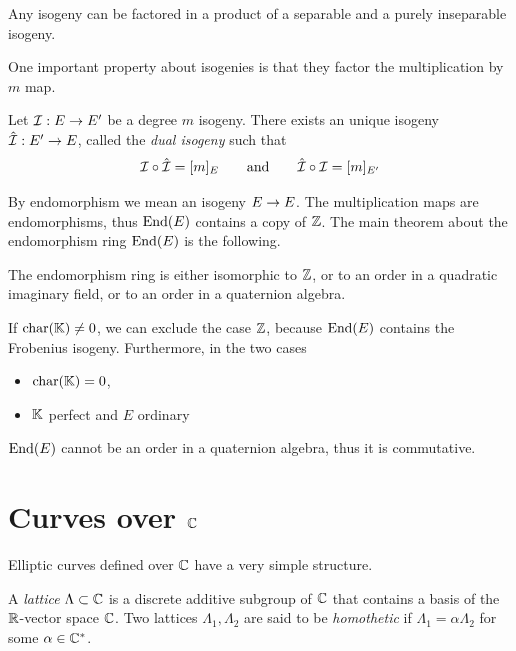 \begin{theorem}
  Any isogeny can be factored in a product of a separable and a purely
  inseparable isogeny.
\end{theorem}

One important property about isogenies is that they factor the
multiplication by $m$ map.

\begin{definition}
  Let $\mathcal{I} : E \rightarrow E'$ be a degree $m$ isogeny. There exists an
  unique isogeny $\hat{\mathcal{I}} : E' \rightarrow E$, called the
  \emph{dual isogeny} such
  that
  \[\mathcal{I}\circ\hat{\mathcal{I}} = [m]_E \qquad\text{and}\qquad \hat{\mathcal{I}}\circ\mathcal{I} =
  [m]_{E'}\]
\end{definition}

By endomorphism we mean an isogeny $E\rightarrow E$. The multiplication maps
are endomorphisms, thus $\operatorname{End}(E)$ contains a copy of $\mathbb{Z}$.  The main
theorem about the endomorphism ring $\operatorname{End}(E)$ is the following.

\begin{theorem}
  The endomorphism ring is either isomorphic to $\mathbb{Z}$, or to an order
  in a quadratic imaginary field, or to an order in a quaternion
  algebra.
\end{theorem}

If $\operatorname{char}(\mathbb{K})\ne0$, we can exclude the case $\mathbb{Z}$, because $\operatorname{End}(E)$
contains the Frobenius isogeny. Furthermore, in the two cases
\begin{itemize}
\item $\operatorname{char}(\mathbb{K})=0$,
\item $\mathbb{K}$ perfect and $E$ ordinary
\end{itemize}
$\operatorname{End}(E)$ cannot be an order in a quaternion algebra, thus it is
commutative.


\section{Curves over $\mathbb{C}$}
\label{sec:curves-over-c}
Elliptic curves defined over $\mathbb{C}$ have a very simple structure.

\begin{definition}[Lattice]
  A \emph{lattice} $\Lambda\subset\mathbb{C}$ is a discrete
  additive subgroup of $\mathbb{C}$ that contains a basis of the $\mathbb{R}$-vector
  space $\mathbb{C}$. Two lattices $\Lambda_1,\Lambda_2$ are said to be
  \emph{homothetic} if $\Lambda_1=\alpha\Lambda_2$ for some
  $\alpha\in\mathbb{C}^{\ast}$.
\end{definition}

